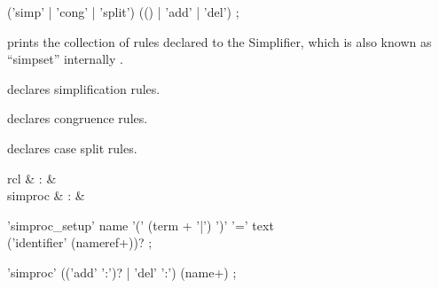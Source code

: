 \begin{isabellebody}
\begin{isamarkuptext}
  \begin{rail}
    ('simp' | 'cong' | 'split') (() | 'add' | 'del')
    ;
  \end{rail}

  \begin{descr}

  \item [\hyperlink{command.print_simpset}{\mbox{\isa{\isacommand{print{\isacharunderscore}simpset}}}}] prints the collection of rules
  declared to the Simplifier, which is also known as ``simpset''
  internally \cite{isabelle-ref}.

  \item [\hyperlink{attribute.simp}{\mbox{\isa{simp}}}] declares simplification rules.

  \item [\hyperlink{attribute.cong}{\mbox{\isa{cong}}}] declares congruence rules.

  \item [\hyperlink{attribute.split}{\mbox{\isa{split}}}] declares case split rules.

  \end{descr}%
\end{isamarkuptext}%
\isamarkuptrue%
%
\isamarkuptrue%
%
\begin{isamarkuptext}%
\begin{matharray}{rcl}
    \hypertarget{command.simproc_setup}{\hyperlink{command.simproc_setup}{\mbox{}}} & : &  \\
    simproc & : & \isaratt \\
  \end{matharray}

  \begin{rail}
    'simproc\_setup' name '(' (term + '|') ')' '=' text \\ ('identifier' (nameref+))?
    ;

    'simproc' (('add' ':')? | 'del' ':') (name+)
    ;
  \end{rail}

  \begin{descr}


\end{descr}
\end{isamarkuptext}
\end{isabellebody}
